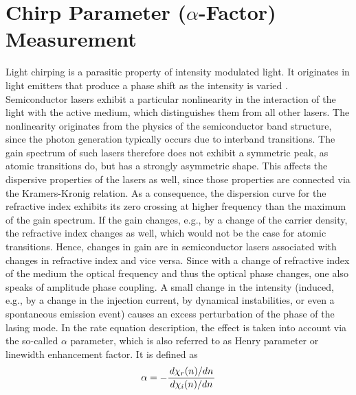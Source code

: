 \section{Chirp Parameter ($\alpha$-Factor) Measurement}
Light chirping is a parasitic property of intensity modulated light. It originates in light emitters that produce a phase shift as the intensity is varied \cite{devaux1993simple}. Semiconductor lasers exhibit a particular nonlinearity in the interaction of the light with the active medium, which distinguishes them from all other lasers. The nonlinearity originates from the physics of the semiconductor band structure, since the photon generation typically occurs due to interband transitions. The gain spectrum of such lasers therefore does not exhibit a symmetric peak, as atomic transitions do, but has a strongly asymmetric shape. This affects the dispersive properties of the lasers as well, since those properties are connected via the Kramers-Kronig relation. As a consequence, the dispersion curve for the refractive index exhibits its zero crossing at higher frequency than the maximum of the gain spectrum. If the gain changes, e.g., by a change of the carrier density, the refractive index changes as well, which would not be the case for atomic transitions. Hence, changes in gain are in semiconductor lasers associated with changes in refractive index and vice versa. Since with a change of refractive index of the medium the optical frequency and thus the optical phase changes, one also speaks of amplitude phase coupling. A small change in the intensity (induced, e.g., by a change in the injection current, by dynamical instabilities, or even a spontaneous emission event) causes an excess perturbation of the phase of the lasing mode. In the rate equation description, the effect is taken into account via the so-called $\alpha$ parameter, which is also referred to as Henry parameter or linewidth enhancement factor. It is defined as
\begin{equation}
    \alpha=-\frac{\dv*{\chi_r(n)}{n}}{\dv*{\chi_i(n)}{n}}
\end{equation}


